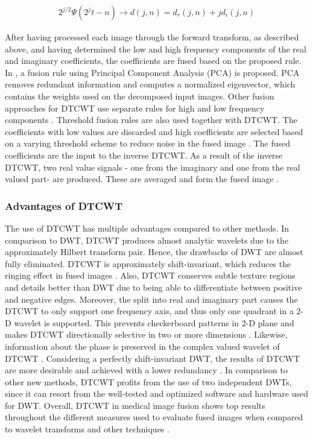 \documentclass{article}
\begin{document}
 \begin{gather}\label{eq:6}
      2^{j/2}\Psi(2^j t-n) \longrightarrow d(j,n) = d_r(j,n)+jd_i(j,n)
 \end{gather}
 
After having processed each image through the forward transform, as described above, and having determined the low and high frequency components of the real and imaginary coefficients, the coefficients are fused based on the proposed rule.
In \cite{K.Padmavathi.2016}, a fusion rule using Principal Component Analysis (PCA) is proposed. PCA removes redundant information and computes a normalized eigenvector, which contains the weights used on the decomposed input images. Other fusion approaches for DTCWT use separate rules for high and low frequency components \cite{Talbi.2018, Xiaozhu.27.07.201529.07.2015}. Threshold fusion rules are also used together with DTCWT. The coefficients with low values are discarded and high coefficients are selected based on a varying threshold scheme to reduce noise in the fused image \cite{Srivastava.2016}. 
The fused coefficients are the input to the inverse DTCWT. As a result of the inverse DTCWT, two real value signals - one from the imaginary and one from the real valued part- are produced. These are averaged and form the fused image \cite{Talbi.2018}.

 \subsubsection{Advantages of DTCWT}
 \label{ADV_DTCWT}
The use of DTCWT has multiple advantages compared to other methods. In comparison to DWT, DTCWT produces almost analytic wavelets due to the approximately Hilbert transform pair. Hence, the drawbacks of DWT are almost fully eliminated. DTCWT is approximately shift-invariant, which reduces the ringing effect in fused images \cite{Talbi.2018}. Also, DTCWT conserves subtle texture regions and details better than DWT due to being able to differentiate between positive and negative edges\cite{Talbi.2018}. Moreover, the split into real and imaginary part causes the DTCWT to only support one frequency axis, and thus only one quadrant in a 2-D wavelet is supported. This prevents checkerboard patterns in 2-D plane and makes DTCWT directionally selective in two or more dimensions \cite{K.Padmavathi.2016}. Likewise, information about the phase is preserved in the complex valued wavelet of DTCWT \cite{K.Padmavathi.2016, Talbi.2018, IvanW.Selesnick.2005}.
Considering a perfectly shift-invariant DWT, the results of DTCWT are more desirable and achieved with a lower redundancy \cite{Talbi.2018, IvanW.Selesnick.2005}.
In comparison to other new methods, DTCWT profits from the use of two independent DWTs, since it can resort from the well-tested and optimized software and hardware used for DWT. Overall, DTCWT in medical image fusion shows top results throughout the different measures used to evaluate fused images when compared to wavelet transforms and other techniques \cite{Srivastava.2016, Goel.2017}.
\end{document}
